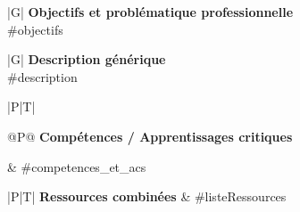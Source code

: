 \begin{tabular}{|G|}
	\hline
	\textcolor{saeC}{\bfseries Objectifs et problématique professionnelle} \\
	\hline
	 #objectifs
	\\
\hline
\end{tabular}

\begin{tabular}{|G|}
	\textcolor{saeC}{\bfseries Description générique} \\
	\hline
    #description \\
\hline
\end{tabular}

\begin{tabular}[t]{|P|T|}
\hline
    \begin{tabular}[t]{@{}P@{}}
        \bfseries \textcolor{saeC}{Compétences /} \tabularnewline
        \bfseries \textcolor{saeC}{Apprentissages} \tabularnewline
        \bfseries \textcolor{saeC}{critiques}
    \end{tabular}
    &
    #competences_et_acs \\
\hline
\end{tabular}

\begin{tabular}[t]{|P|T|}
\hline
    \textcolor{saeC}{\bfseries Ressources combinées }
    &
    #listeRessources %
    \\
\hline
\end{tabular}




